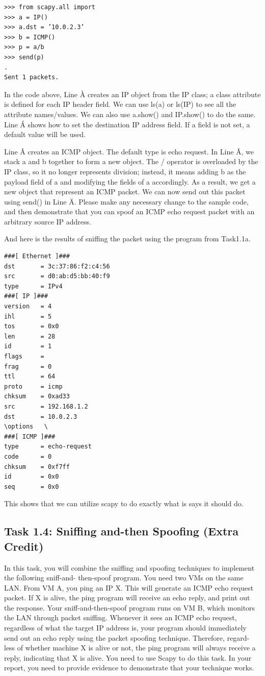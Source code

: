 \documentclass[12pt]{article}
\begin{document}
\begin{verbatim}
>>> from scapy.all import
>>> a = IP()
>>> a.dst = ’10.0.2.3’
>>> b = ICMP()
>>> p = a/b
>>> send(p)
.
Sent 1 packets.
\end{verbatim}
In the code above, Line À creates an IP object from the IP class; a class attribute is defined for each IP
header field. We can use ls(a) or ls(IP) to see all the attribute names/values. We can also use a.show()
and IP.show() to do the same. Line Á shows how to set the destination IP address field. If a field is not set,
a default value will be used.

Line Â creates an ICMP object. The default type is echo request. In Line Ã, we stack a and b together
to form a new object. The / operator is overloaded by the IP class, so it no longer represents division;
instead, it means adding b as the payload field of a and modifying the fields of a accordingly. As a result,
we get a new object that represent an ICMP packet. We can now send out this packet using send() in
Line Ä. Please make any necessary change to the sample code, and then demonstrate that you can spoof an
ICMP echo request packet with an arbitrary source IP address.


And here is the results of sniffing the packet using the program from Task1.1a.
\begin{verbatim}
###[ Ethernet ]###
dst       = 3c:37:86:f2:c4:56
src       = d0:ab:d5:bb:40:f9
type      = IPv4
###[ IP ]###
version   = 4
ihl       = 5
tos       = 0x0
len       = 28
id        = 1
flags     =
frag      = 0
ttl       = 64
proto     = icmp
chksum    = 0xad33
src       = 192.168.1.2
dst       = 10.0.2.3
\options   \
###[ ICMP ]###
type      = echo-request
code      = 0
chksum    = 0xf7ff
id        = 0x0
seq       = 0x0
\end{verbatim}

This shows that we can utilize scapy to do exactly what is says it should do.




\subsection{Task 1.4: Sniffing and-then Spoofing (Extra Credit)}
In this task, you will combine the sniffing and spoofing techniques to implement the following sniff-and-
then-spoof program. You need two VMs on the same LAN. From VM A, you ping an IP X. This will
generate an ICMP echo request packet. If X is alive, the ping program will receive an echo reply, and
print out the response. Your sniff-and-then-spoof program runs on VM B, which monitors the LAN through
packet sniffing. Whenever it sees an ICMP echo request, regardless of what the target IP address is, your
program should immediately send out an echo reply using the packet spoofing technique. Therefore, regard-
less of whether machine X is alive or not, the ping program will always receive a reply, indicating that X
is alive. You need to use Scapy to do this task. In your report, you need to provide evidence to demonstrate
that your technique works.
\end{document}
